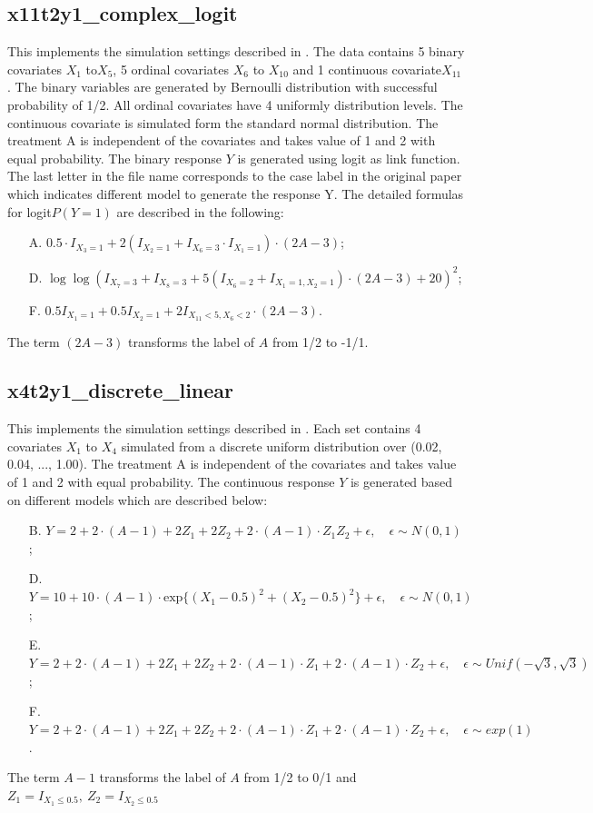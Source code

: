 \documentclass[12pt]{article}
\begin{document}
\subsection*{x11t2y1\_complex\_logit}
This implements the simulation settings described in \cite{xu2015regularized}. The data contains 5 binary covariates $X_1$ to$ X_5$, 5 ordinal covariates $X_6$ to $X_{10}$ and 1 continuous covariate$X_{11}$. The binary variables are generated by Bernoulli distribution with successful probability of 1/2. All ordinal covariates have 4 uniformly distribution levels. The continuous covariate is simulated form the standard normal distribution. The treatment A is independent of the covariates and takes value of 1 and 2 with equal probability. The binary response $Y$ is generated using logit as link function. The last letter in the file name corresponds to the case label in the original paper which indicates different model to generate the response Y. The detailed formulas for logit$P(Y=1)$ are described in the following:
\begin{enumerate}
	\item [A.] $0.5\cdot I_{X_3=1}+2(I_{X_2=1}+I_{X_6=3}\cdot I_{X_1=1})\cdot (2A-3)$;
	\item[D.] $\log \log (I_{X_7=3}+I_{X_8=3} +5(I_{X_6=2} + I_{X_1=1,X_2=1})\cdot(2A-3)+20)^2$;
	\item[F.] $0.5I_{X_1=1}+0.5I_{X_2=1}+2I_{X_{11}<5, X_6<2}\cdot(2A-3)$.
\end{enumerate}
The term $(2A-3)$ transforms the label of $A$ from 1/2 to -1/1.

\subsection*{x4t2y1\_discrete\_linear}
This implements the simulation settings described in \cite{su2009subgroup}. Each set contains 4 covariates $X_1$ to $X_4$ simulated from a discrete uniform distribution over (0.02, 0.04, ..., 1.00). The treatment A is independent of the covariates and takes value of 1 and 2 with equal probability. The continuous response $Y$ is generated based on different models which are described below:
\begin{enumerate}
	\item [B.] $Y=2+2\cdot (A-1) +2Z_1+2Z_2 +2\cdot (A-1)\cdot Z_1 Z_2 +\epsilon,\quad \epsilon\sim N(0,1)$;
	\item [D.] $Y=10+10\cdot (A-1)\cdot \text{exp}\{(X_1-0.5)^2+(X_2-0.5)^2\} + \epsilon, \quad \epsilon\sim N(0,1)$;
	\item [E.] $Y=2+2\cdot (A-1) +2Z_1+2Z_2 +2\cdot (A-1)\cdot Z_1 + 2\cdot (A-1)\cdot Z_2 +\epsilon,\quad \epsilon\sim Unif(-\sqrt{3},\sqrt{3})$;
	\item [F.] $Y=2+2\cdot (A-1) +2Z_1+2Z_2 +2\cdot (A-1)\cdot Z_1 + 2\cdot (A-1)\cdot Z_2 +\epsilon,\quad \epsilon\sim exp(1)$.
\end{enumerate}
The term $A-1$ transforms the label of $A$ from 1/2 to 0/1 and $Z_1=I_{X_1\le 0.5},~Z_2=I_{X_2\le 0.5}$
\end{document}
